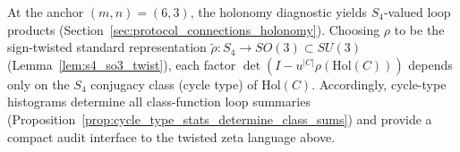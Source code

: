 \begin{remark}[Anchor specialization: $\Gamma=S_4$ and a $3$-dimensional twist]\label{rem:anchor_twisted_zeta_s4}
\AuditTag At the anchor $(m,n)=(6,3)$, the holonomy diagnostic yields $S_4$-valued loop products (Section~\ref{sec:protocol_connections_holonomy}).
Choosing $\rho$ to be the sign-twisted standard representation $\widetilde\rho:S_4\to SO(3)\subset SU(3)$ (Lemma~\ref{lem:s4_so3_twist}),
each factor $\det(I-u^{|C|}\rho(\mathrm{Hol}(C)))$ depends only on the $S_4$ conjugacy class (cycle type) of $\mathrm{Hol}(C)$.
Accordingly, cycle-type histograms determine all class-function loop summaries (Proposition~\ref{prop:cycle_type_stats_determine_class_sums}) and provide a compact audit interface to the twisted zeta language above.
\end{remark}


